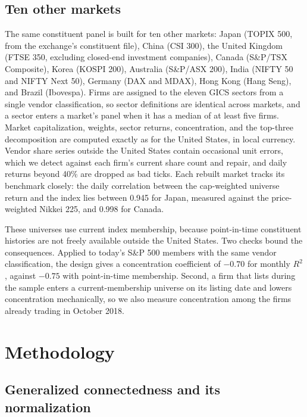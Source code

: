 \documentclass[11pt]{article}
\begin{document}
\subsection{Ten other markets}\label{sec:intldata}

The same constituent panel is built for ten other markets: Japan (TOPIX 500, from the exchange's constituent file), China (CSI 300), the United Kingdom (FTSE 350, excluding closed-end investment companies), Canada (S\&P/TSX Composite), Korea (KOSPI 200), Australia (S\&P/ASX 200), India (NIFTY 50 and NIFTY Next 50), Germany (DAX and MDAX), Hong Kong (Hang Seng), and Brazil (Ibovespa). Firms are assigned to the eleven GICS sectors from a single vendor classification, so sector definitions are identical across markets, and a sector enters a market's panel when it has a median of at least five firms. Market capitalization, weights, sector returns, concentration, and the top-three decomposition are computed exactly as for the United States, in local currency. Vendor share series outside the United States contain occasional unit errors, which we detect against each firm's current share count and repair, and daily returns beyond 40\% are dropped as bad ticks. Each rebuilt market tracks its benchmark closely: the daily correlation between the cap-weighted universe return and the index lies between 0.945 for Japan, measured against the price-weighted Nikkei 225, and 0.998 for Canada.

These universes use current index membership, because point-in-time constituent histories are not freely available outside the United States. Two checks bound the consequences. Applied to today's S\&P 500 members with the same vendor classification, the design gives a concentration coefficient of $-0.70$ for monthly $R^2$, against $-0.75$ with point-in-time membership. Second, a firm that lists during the sample enters a current-membership universe on its listing date and lowers concentration mechanically, so we also measure concentration among the firms already trading in October 2018.

\section{Methodology}\label{sec:method}

\subsection{Generalized connectedness and its normalization}
\end{document}
